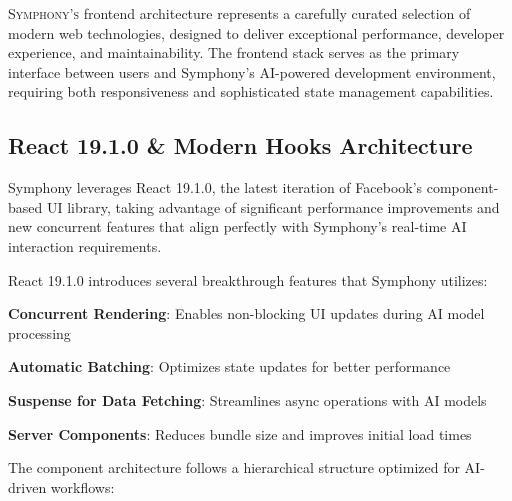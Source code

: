 
\lettrine{S}{ymphony's} frontend architecture represents a carefully curated selection of modern web technologies, designed to deliver exceptional performance, developer experience, and maintainability. The frontend stack serves as the primary interface between users and Symphony's AI-powered development environment, requiring both responsiveness and sophisticated state management capabilities.

\subsection*{React 19.1.0 \& Modern Hooks Architecture}

Symphony leverages React 19.1.0, the latest iteration of Facebook's component-based UI library, taking advantage of significant performance improvements and new concurrent features that align perfectly with Symphony's real-time AI interaction requirements.

\begin{infobox}[title=React 19.1.0 Key Features]
React 19.1.0 introduces several breakthrough features that Symphony utilizes:
\begin{compactlist}
    \item \textbf{Concurrent Rendering}: Enables non-blocking UI updates during AI model processing
    \item \textbf{Automatic Batching}: Optimizes state updates for better performance
    \item \textbf{Suspense for Data Fetching}: Streamlines async operations with AI models
    \item \textbf{Server Components}: Reduces bundle size and improves initial load times
\end{compactlist}
\end{infobox}

The component architecture follows a hierarchical structure optimized for AI-driven workflows:

